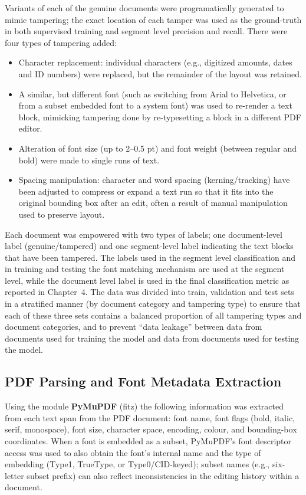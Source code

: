 Variants of each of the genuine documents were programatically generated to mimic tampering; the exact location of each tamper was used as the ground-truth in both supervised training and segment level precision and recall. There were four types of tampering added:

\begin{itemize}
    \item Character replacement: individual characters (e.g., digitized amounts, dates and ID numbers) were replaced, but the remainder of the layout was retained.
    \item A similar, but different font (such as switching from Arial to Helvetica, or from a subset embedded font to a system font) was used to re-render a text block, mimicking tampering done by re-typesetting a block in a different PDF editor.
    \item Alteration of font size (up to 2–0.5 pt) and font weight (between regular and bold) were made to single runs of text.
    \item Spacing manipulation: character and word spacing (kerning/tracking) have been adjusted to compress or expand a text run so that it fits into the original bounding box after an edit, often a result of manual manipulation used to preserve layout.
\end{itemize}

\noindent Each document was empowered with two types of labels; one document-level label (genuine/tampered) and one segment-level label indicating the text blocks that have been tampered. The labels used in the segment level classification and in training and testing the font matching mechanism are used at the segment level, while the document level label is used in the final classification metric as reported in Chapter~4. The data was divided into train, validation and test sets in a stratified manner (by document category and tampering type) to ensure that each of these three sets contains a balanced proportion of all tampering types and document categories, and to prevent “data leakage” between data from documents used for training the model and data from documents used for testing the model.

\subsection{PDF Parsing and Font Metadata Extraction}

Using the module \textbf{PyMuPDF} (fitz) the following information was extracted from each text span from the PDF document: font name, font flags (bold, italic, serif, monospace), font size, character space, encoding, colour, and bounding-box coordinates. When a font is embedded as a subset, PyMuPDF's font descriptor access was used to also obtain the font's internal name and the type of embedding (Type1, TrueType, or Type0/CID-keyed); subset names (e.g., six-letter subset prefix) can also reflect inconsistencies in the editing history within a document.

